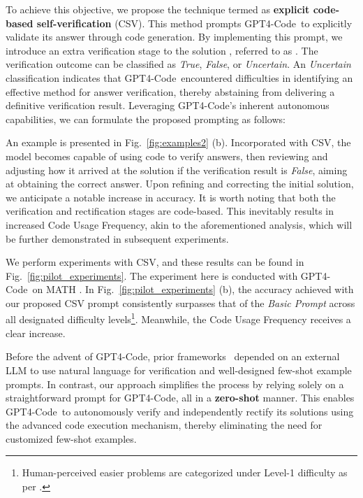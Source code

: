 \documentclass{article} \usepackage{iclr2023_conference,times}
\newcommand{\gptcode}{GPT4-Code}
\begin{document}
To achieve this objective, we propose the technique termed as \textbf{explicit code-based self-verification} (CSV). This method prompts \gptcode~to explicitly validate its answer through code generation. By implementing this prompt, we introduce an extra verification stage to the solution , referred to as . The verification outcome  can be classified as \textit{True}, \textit{False}, or \textit{Uncertain}. An \textit{Uncertain} classification indicates that \gptcode~encountered difficulties in identifying an effective method for answer verification, thereby abstaining from delivering a definitive verification result. Leveraging \gptcode's inherent autonomous capabilities, we can formulate the proposed prompting as follows:



An example is presented in Fig.~\ref{fig:examples2} (b). Incorporated with CSV, the model becomes capable of using code to verify answers, then reviewing and adjusting how it arrived at the solution if the verification result is \textit{False}, aiming at obtaining the correct answer. Upon refining and correcting the initial solution, we anticipate a notable increase in accuracy. It is worth noting that both the verification and rectification stages are code-based. This inevitably results in increased Code Usage Frequency, akin to the aforementioned analysis, which will be further demonstrated in subsequent experiments.

We perform experiments with CSV, and these results can be found in Fig.~\ref{fig:pilot_experiments}. The
experiment here is conducted with \gptcode~on MATH \citep{hendrycks2021measuring}. In Fig.~\ref{fig:pilot_experiments} (b), the accuracy achieved with our proposed CSV prompt consistently surpasses that of the \textit{Basic Prompt} across all designated difficulty levels\footnote{Human-perceived easier problems are categorized under Level-1 difficulty as per \cite{hendrycks2021measuring}.}. Meanwhile, the Code Usage Frequency receives a clear increase.

Before the advent of \gptcode, prior frameworks~\citep{lightman2023lets,cobbe2021gsm8k} depended on an external LLM to use natural language for verification and well-designed few-shot example prompts. In contrast, our approach simplifies the process by relying solely on a straightforward prompt for \gptcode, all in a \textbf{zero-shot} manner. This enables \gptcode~to autonomously verify and independently rectify its solutions using the advanced code execution mechanism, thereby eliminating the need for customized few-shot examples.
\end{document}
